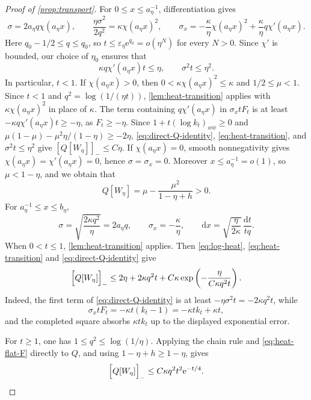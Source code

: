 \documentclass[11pt,a4paper]{article}
\begin{document}
\begin{proof}[Proof of \cref{prop:transport}]
		For $0\le x\le a_\eta^{-1}$, differentiation gives
		\[
			\sigma=2a_\eta q\chi(a_\eta x),\qquad
			\frac{\eta\sigma^2}{2q^2}=\kappa\chi(a_\eta x)^2,\qquad
			\sigma_x=-\frac{\kappa}{\eta}\chi(a_\eta x)^2
			+\frac{\kappa}{\eta}q\chi'(a_\eta x).
		\]
		Here $q_0-1/2\le q\le q_0$, so
		$t\le\varepsilon_\eta\mathrm{e}^{q_0}=o(\eta^N)$ for every $N>0$.
		Since $\chi'$ is bounded, our choice of $\eta_0$ ensures that
		\[
			\kappa q\chi'(a_\eta x)t\le\eta,\qquad
			\sigma^2t\le\eta^2.
		\]
		In particular, $t<1$.
		If $\chi(a_\eta x)>0$, then
		$0<\kappa\chi(a_\eta x)^2\le\kappa$ and $1/2\le\mu<1$.
		Since $t<1$ and $q^2=\log(1/(\eta t))$,
		\cref{lem:heat-transition} applies with
		$\kappa\chi(a_\eta x)^2$ in place of $\kappa$.
		The term containing $q\chi'(a_\eta x)$ in $\sigma_x tF_t$ is at
		least $-\kappa q\chi'(a_\eta x)t\ge-\eta$, as $F_t\ge-\eta$.
		Since
		$1+t(\log k_t)_{w\bar w}\ge0$ and
		$\mu(1-\mu)-\mu^2\eta/(1-\eta)\ge-2\eta$,
		\eqref{eq:direct-Q-identity}, \eqref{eq:heat-transition}, and
		$\sigma^2t\le\eta^2$ give $[Q[W_\eta]]_-\le C\eta$.
		If $\chi(a_\eta x)=0$, smooth nonnegativity gives
		$\chi(a_\eta x)=\chi'(a_\eta x)=0$, hence
		$\sigma=\sigma_x=0$.  Moreover
		$x\le a_\eta^{-1}=o(1)$, so $\mu<1-\eta$, and we obtain that
		\[
			Q[W_\eta]=\mu-\frac{\mu^2}{1-\eta+h}>0.
		\]
		For $a_\eta^{-1}\le x\le b_\eta$,
		\[
			\sigma=\sqrt{\frac{2\kappa q^2}{\eta}}=2a_\eta q,\qquad
			\sigma_x=-\frac{\kappa}{\eta},\qquad
			\mathrm{d}x=
			\sqrt{\frac{\eta}{2\kappa}}\,
			\frac{\mathrm{d}t}{tq}.
		\]
		When $0<t\le1$, \cref{lem:heat-transition} applies.  Then \eqref{eq:log-heat}, \eqref{eq:heat-transition} and \eqref{eq:direct-Q-identity} give
		\[
			\Bigl[Q[W_\eta]\Bigr]_-
			\le2\eta+2\kappa q^2t
			+C\kappa
			\exp\left(-\frac{\eta}{C\kappa q^2t}\right).
		\]
		Indeed, the first term of \eqref{eq:direct-Q-identity} is at least
		$-\eta\sigma^2t=-2\kappa q^2t$, while
		\[
			\sigma_x tF_t=-\kappa t(k_t-1)
			=-\kappa tk_t+\kappa t,
		\]
		and the completed square absorbs $\kappa tk_t$ up to the displayed
		exponential error.

		For $t\ge1$, one has $1\le q^2\le\log(1/\eta)$.  Applying the
		chain rule and \eqref{eq:heat-flat-F} directly to $Q$, and using
		$1-\eta+h\ge1-\eta$, gives
		\[
			\Bigl[Q[W_\eta]\Bigr]_-
			\le C\kappa q^2t^2\mathrm{e}^{-t/4}.
		\]


\end{proof}
\end{document}
